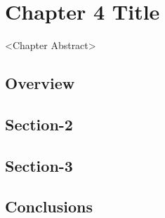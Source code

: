 %
%


\chapter{Chapter 4 Title}
<Chapter Abstract>

\section{Overview}


\section{Section-2}


\section{Section-3}


\section{Conclusions}
